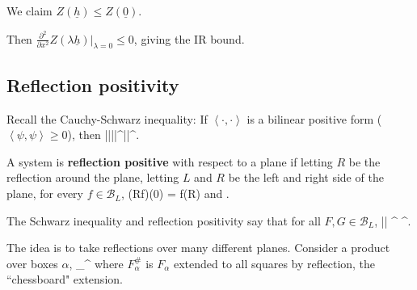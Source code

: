We claim $Z(\underline{h}) \le Z(\underline{0})$.

Then $\frac{\partial^2 }{\partial {x}^2} Z(\lambda \underline{h})|_{\lambda=0} \le 0$, giving the IR bound.

\subsection{Reflection positivity}
Recall the Cauchy-Schwarz inequality: If $\left\langle {\cdot, \cdot}\right\rangle$ is a bilinear positive form ($\left\langle {\psi,\psi}\right\rangle\ge 0$), then
\be
|\left\langle {\psi,\varphi}\right\rangle|\le |\left\langle {\psi|\psi}\right\rangle|^{}|\left\langle {\varphi,\varphi}\right\rangle|^{}.
\ee

\begin{definition}
A system is \textbf{reflection positive} with respect to a plane if letting $R$ be the reflection around the plane, letting $L$ and $R$ be the left and right side of the plane, for every $f\in \mathcal{B}_L$,
\be
(Rf)(0) = f(R\sigma)
\ee
and
\be
\left{}\right\rangle{}.
\ee
\end{definition}
The Schwarz inequality and reflection positivity say that for all $F,G\in \mathcal{B}_L$, 
\be
|\left{}\right\rangle| \le \left{}\right\rangle^{} \cdots \left{}\right\rangle^{}.
\ee

The idea is to take reflections over many different planes. Consider a product over boxes $\alpha$,
\be
\left{}\right\rangle \le \prod_\alpha\left{}\right\rangle^{}
\ee
where $F_\alpha^{\#}$ is $F_\alpha$ extended to all squares by reflection, the ``chessboard" extension. %
